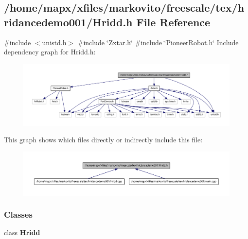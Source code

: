 \subsection{/home/mapx/xfiles/markovito/freescale/tex/hridancedemo001/\-Hridd.h \-File \-Reference}
\label{_hridd_8h}
{\ttfamily \#include $<$unistd.\-h$>$}\*
{\ttfamily \#include \char`\"{}\-Zxtar.\-h\char`\"{}}\*
{\ttfamily \#include \char`\"{}\-Pioneer\-Robot.\-h\char`\"{}}\*
\-Include dependency graph for \-Hridd.\-h\-:\nopagebreak
\begin{figure}[H]
\begin{center}
\leavevmode
\includegraphics[width=350pt]{_hridd_8h__incl}
\end{center}
\end{figure}
\-This graph shows which files directly or indirectly include this file\-:\nopagebreak
\begin{figure}[H]
\begin{center}
\leavevmode
\includegraphics[width=350pt]{_hridd_8h__dep__incl}
\end{center}
\end{figure}
\subsubsection*{\-Classes}
\begin{DoxyCompactItemize}
\item 
class {\bf \-Hridd}
\end{DoxyCompactItemize}

